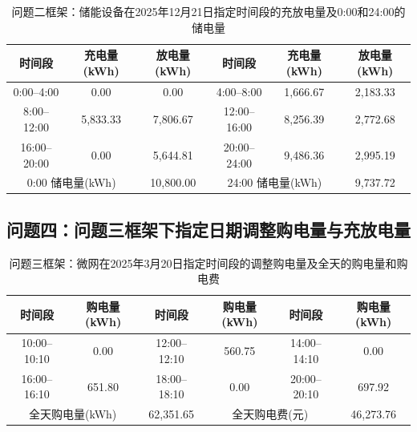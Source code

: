 \begin{table}[H]
  \centering
  \caption{问题二框架：储能设备在2025年12月21日指定时间段的充放电量及0:00和24:00的储电量}
  \label{tab:q4-2-storage-1221}
  \small
  \renewcommand{\arraystretch}{1.3}
  \begin{tabular}{|c|c|c|c|c|c|}
    \hline
    时间段 & 充电量(kWh) & 放电量(kWh) & 时间段 & 充电量(kWh) & 放电量(kWh) \\
    \hline
    0:00--4:00 & 0.00 & 0.00 & 4:00--8:00 & 1{,}666.67 & 2{,}183.33 \\
    \hline
    8:00--12:00 & 5{,}833.33 & 7{,}806.67 & 12:00--16:00 & 8{,}256.39 & 2{,}772.68 \\
    \hline
    16:00--20:00 & 0.00 & 5{,}644.81 & 20:00--24:00 & 9{,}486.36 & 2{,}995.19 \\
    \hline
    \multicolumn{2}{|c|}{0:00 储电量(kWh)} & \multicolumn{1}{c|}{10{,}800.00} & \multicolumn{2}{c|}{24:00 储电量(kWh)} & \multicolumn{1}{c|}{9{,}737.72} \\
    \hline
  \end{tabular}
\end{table}

\subsection*{问题四：问题三框架下指定日期调整购电量与充放电量}

\begin{table}[H]
  \centering
  \caption{问题三框架：微网在2025年3月20日指定时间段的调整购电量及全天的购电量和购电费}
  \label{tab:q4-3-adj-0320}
  \small
  \renewcommand{\arraystretch}{1.3}
  \begin{tabular}{|c|c|c|c|c|c|}
    \hline
    时间段 & 购电量(kWh) & 时间段 & 购电量(kWh) & 时间段 & 购电量(kWh) \\
    \hline
    10:00--10:10 & 0.00 & 12:00--12:10 & 560.75 & 14:00--14:10 & 0.00 \\
    \hline
    16:00--16:10 & 651.80 & 18:00--18:10 & 0.00 & 20:00--20:10 & 697.92 \\
    \hline
    \multicolumn{2}{|c|}{全天购电量(kWh)} & \multicolumn{1}{c|}{62{,}351.65} & \multicolumn{2}{c|}{全天购电费(元)} & \multicolumn{1}{c|}{46{,}273.76} \\
    \hline
  \end{tabular}
\end{table}

